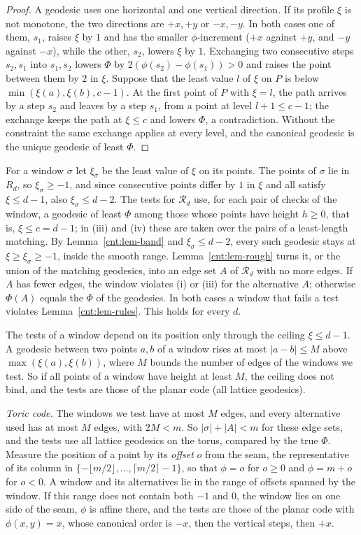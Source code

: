 \documentclass[11pt]{amsart}
\theoremstyle{definition}
\theoremstyle{remark}
\numberwithin{equation}{section}
\begin{document}
\begin{proof}
A geodesic uses one horizontal and one vertical direction. If its profile $\xi$ is not monotone, the two directions
are $+x,+y$ or $-x,-y$. In both cases one of them, $s_1$, raises $\xi$ by $1$ and has the smaller $\phi$-increment
($+x$ against $+y$, and $-y$ against $-x$), while the other, $s_2$, lowers $\xi$ by $1$. Exchanging two consecutive
steps $s_2,s_1$ into $s_1,s_2$ lowers $\Phi$ by $2(\phi(s_2)-\phi(s_1))>0$ and raises the point between them by $2$ in
$\xi$. Suppose that the least value $l$ of $\xi$ on $P$ is below $\min(\xi(a),\xi(b),c-1)$. At the first point of $P$
with $\xi=l$, the path arrives by a step $s_2$ and leaves by a step $s_1$, from a point at level $l+1\le c-1$; the
exchange keeps the path at $\xi\le c$ and lowers $\Phi$, a contradiction. Without the constraint the same exchange
applies at every level, and the canonical geodesic is the unique geodesic of least $\Phi$.
\end{proof}

For a window $\sigma$ let $\xi_\sigma$ be the least value of $\xi$ on its points. The points of $\sigma$ lie in
$R_d$, so $\xi_\sigma\ge-1$, and since consecutive points differ by $1$ in $\xi$ and all satisfy $\xi\le d-1$, also
$\xi_\sigma\le d-2$. The tests for $\mathcal R_d$ use, for each pair of checks of the window, a geodesic of least
$\Phi$ among those whose points have height $h\ge0$, that is, $\xi\le c=d-1$; in (iii) and (iv) these are taken over
the pairs of a least-length matching. By Lemma~\ref{cnt:lem-band} and $\xi_\sigma\le d-2$, every such geodesic stays at
$\xi\ge\xi_\sigma\ge-1$, inside the smooth range. Lemma~\ref{cnt:lem-rough} turns it, or the union of the matching
geodesics, into an edge set $A$ of $\mathcal R_d$ with no more edges. If $A$ has fewer edges, the window violates (i)
or (iii) for the alternative $A$; otherwise $\Phi(A)$ equals the $\Phi$ of the geodesics. In both cases a window that
fails a test violates Lemma~\ref{cnt:lem-rules}. This holds for every $d$.

The tests of a window depend on its position only through the ceiling $\xi\le d-1$. A geodesic between two points
$a,b$ of a window rises at most $|a-b|\le M$ above $\max(\xi(a),\xi(b))$, where $M$ bounds the number of edges of the
windows we test. So if all points of a window have height at least $M$, the ceiling does not bind, and the tests are
those of the planar code (all lattice geodesics).

\emph{Toric code.} The windows we test have at most $M$ edges, and every alternative used has at most $M$ edges, with
$2M<m$. So $|\sigma|+|A|<m$ for these edge sets, and the tests use all lattice geodesics on the torus, compared by the
true $\Phi$. Measure the position of a point by its \emph{offset} $o$ from the seam, the representative of its column
in $\{-\lfloor m/2\rfloor,\dots,\lceil m/2\rceil-1\}$, so that $\phi=o$ for $o\ge0$ and $\phi=m+o$ for $o<0$. A window
and its alternatives lie in the range of offsets spanned by the window. If this range does not contain both $-1$ and
$0$, the window lies on one side of the seam, $\phi$ is affine there, and the tests are those of the planar code with
$\phi(x,y)=x$, whose canonical order is $-x$, then the vertical steps, then $+x$.
\end{document}

